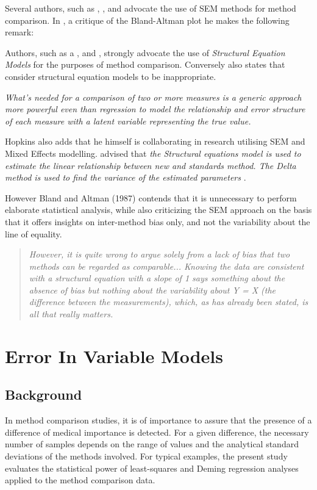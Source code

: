 \documentclass[12pt, a4paper]{report}
\theoremstyle{plain}
\theoremstyle{definition}
\theoremstyle{remark}
\begin{document}
 Several authors, such as \citet{Lewis}, \citet{gkelly1985},\citet{voelkel2005} and \citet{hopkins2004bias} advocate the use of SEM methods for method comparison. In \citet{hopkins2004bias}, a critique of the Bland-Altman plot he makes the following remark:

Authors, such as a \citet{lewis}, \citet{dunnSEME} and \citet{voelkel2005}, strongly advocate the use of \textit{Structural Equation Models} for the purposes of method comparison. Conversely \citet{BA99} also states that consider structural equation models to be inappropriate.

\emph{What's needed for a comparison of two or more measures is a
	generic approach more powerful even than regression to model the
	relationship and error structure of each measure with a latent
	variable representing the true value.}

Hopkins also adds that he himself is collaborating in research utilising SEM and Mixed Effects modelling. \citet{gkelly1985} advised that \textit{the Structural equations model is used to estimate the linear relationship between new and standards method.
The Delta method is used to find the variance of the estimated parameters} \citep{gkelly1985}.


However Bland and Altman (1987) contends that it is unnecessary to perform elaborate statistical analysis, while also criticizing the SEM approach on the basis that it offers insights  on inter-method bias only, and not the variability about the line of equality. 
\begin{quote}
\textit{	However, it is quite wrong to argue solely from a lack of bias that two methods can be regarded as comparable...
Knowing the data are consistent with a structural equation with a slope of 1 says something 
about the absence of bias but nothing about the variability about Y = X (the difference between the measurements), which, as has already been stated, is all that really matters.}
\end{quote}





\chapter{Error In Variable Models}



\section{Background} 
In method comparison studies, it is of importance to assure that the presence of a difference of medical importance is detected. 
For a given difference, the necessary number of samples depends on the range of values and the analytical standard deviations of the methods involved. For typical examples, the present study evaluates the statistical power of least-squares and Deming regression analyses applied to the method comparison data.
\end{document}
